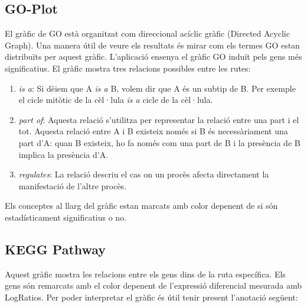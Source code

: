 \subsection{\gls{GO-Plot}}

El gràfic de \gls{GO} està organitzat com direccional acíclic gràfic (Directed Acyclic Graph). Una manera útil de veure els resultats és mirar com els termes \gls{GO} estan distribuïts per aquest gràfic. L'aplicació ensenya el gràfic \gls{GO} induït pels gens més significatius. El gràfic mostra tres relacions possibles entre les rutes: 
\begin{enumerate}
\item \textit{is a}: Si dèiem que A \textit{is a} B, volem dir que A és un subtip de B. Per exemple el cicle mitòtic de la cèl·lula \textit{is a} cicle de la cèl·lula. 
\item \textit{part of}: Aquesta relació s'utilitza per representar la relació entre una part i el tot. Aquesta relació entre A i B existeix només si B és necessàriament una part d'A: quan B existeix, ho fa només com una part de B i la presència de B implica la presència d’A.
\item \textit{regulates}: La relació descriu el cas on un procès afecta directament la manifestació de l'altre procès.
\end{enumerate}

Els conceptes al llarg del gràfic estan marcats amb color depenent de si són estadísticament significatius o no.

\subsection{\gls{KEGG Pathway}}
Aquest gràfic mostra les relacions entre els gens dins de la ruta específica. Els gens són remarcats amb el color depenent de l'expressió diferencial mesurada amb LogRatios. Per poder interpretar el gràfic és útil tenir present l'anotació següent:

